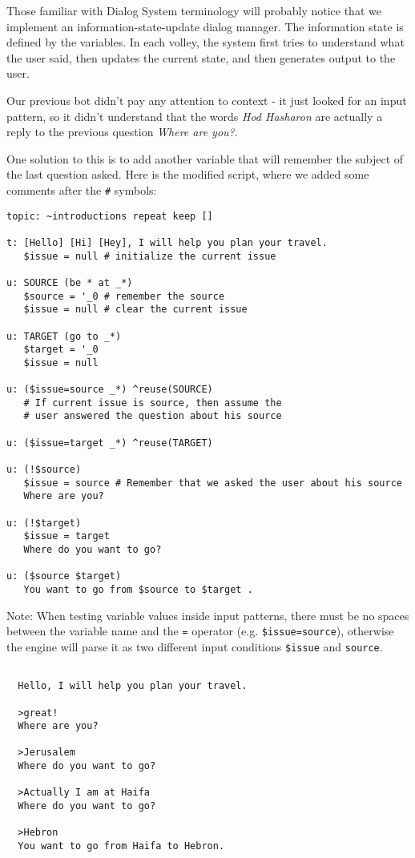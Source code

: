 \documentclass[]{article}
\begin{document}
Those familiar with Dialog System terminology will probably notice that
we implement an information-state-update dialog manager. The information
state is defined by the variables. In each volley, the system first
tries to understand what the user said, then updates the current state,
and then generates output to the user.

Our previous bot didn't pay any attention to context - it just looked
for an input pattern, so it didn't understand that the words \emph{Hod
Hasharon} are actually a reply to the previous question \emph{Where are
you?}.

One solution to this is to add another variable that will remember the
subject of the last question asked. Here is the modified script, where
we added some comments after the \texttt{\#} symbols:

\begin{verbatim}
topic: ~introductions repeat keep []

t: [Hello] [Hi] [Hey], I will help you plan your travel.
   $issue = null # initialize the current issue

u: SOURCE (be * at _*)
   $source = '_0 # remember the source
   $issue = null # clear the current issue

u: TARGET (go to _*)
   $target = '_0
   $issue = null

u: ($issue=source _*) ^reuse(SOURCE) 
   # If current issue is source, then assume the 
   # user answered the question about his source

u: ($issue=target _*) ^reuse(TARGET)

u: (!$source)
   $issue = source # Remember that we asked the user about his source
   Where are you?

u: (!$target)
   $issue = target
   Where do you want to go?

u: ($source $target)
   You want to go from $source to $target .
\end{verbatim}

Note: When testing variable values inside input patterns, there must be
no spaces between the variable name and the \texttt{=} operator (e.g.
\texttt{\$issue=source}), otherwise the engine will parse it as two
different input conditions \texttt{\$issue} and \texttt{source}.

\begin{verbatim}

  Hello, I will help you plan your travel.

  >great!
  Where are you?

  >Jerusalem
  Where do you want to go?

  >Actually I am at Haifa
  Where do you want to go?

  >Hebron
  You want to go from Haifa to Hebron.
\end{verbatim}
\end{document}
